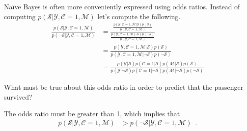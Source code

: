 \documentclass[assignment02_Solutions]{subfiles}
\begin{document}
\begin{exercise}[(45 minutes)]
\item Na\"ive Bayes is often more conveniently expressed using odds ratios.  Instead of computing $p(\mathcal{S}|\mathcal{Y}, \mathcal{C}=1, \mathcal{M})$ let's compute the following.
\begin{align}
\frac{p(\mathcal{S}|\mathcal{Y}, \mathcal{C}=1, \mathcal{M})}{p(\neg \mathcal{S}|\mathcal{Y}, \mathcal{C}=1, \mathcal{M})} &= \frac{\frac{p(\mathcal{Y}, \mathcal{C}=1, \mathcal{M} | \mathcal{S})p(\mathcal{S})}{p(\mathcal{Y},\mathcal{C}=1, \mathcal{M})}}{\frac{p(\mathcal{Y}, \mathcal{C}=1, \mathcal{M} | \neg \mathcal{S})p(\neg \mathcal{S})}{p(\mathcal{Y},\mathcal{C}=1, \mathcal{M})}} \nonumber \\
&=  \frac{p(\mathcal{Y}, \mathcal{C}=1, \mathcal{M} | \mathcal{S})p(\mathcal{S})}{p(\mathcal{Y}, \mathcal{C}=1, \mathcal{M} | \neg \mathcal{S})p(\neg \mathcal{S})} \nonumber \\
&= \frac{p(\mathcal{Y} | \mathcal{S}) p(\mathcal{C}=1 | \mathcal{S}) p(\mathcal{M} | \mathcal{S})p(\mathcal{S})}{p(\mathcal{Y}| \neg \mathcal{S}) p(\mathcal{C}=1 | \neg \mathcal{S}) p(\mathcal{M} | \neg \mathcal{S})p(\neg \mathcal{S})} \nonumber
\end{align}

What must be true about this odds ratio in order to predict that the passenger survived?
\begin{boxedsolution}
The odds ratio must be greater than 1, which implies that
\begin{align}
p(\mathcal{S}|\mathcal{Y}, \mathcal{C}=1, \mathcal{M}) &> p(\neg \mathcal{S}|\mathcal{Y}, \mathcal{C}=1, \mathcal{M}) \enspace . \nonumber
\end{align}
\end{boxedsolution}

\ees
\end{exercise}
\end{document}
